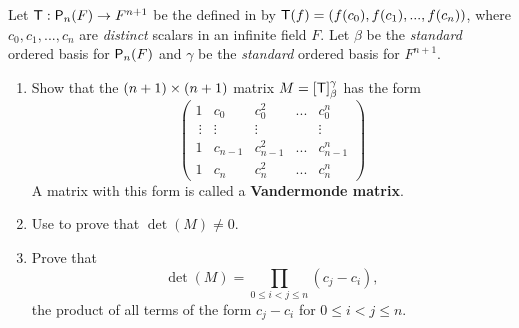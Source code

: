 \begin{exercise} \label{exercise 4.3.22}
Let \(\textsf{T} : \textsf{P}_n(F) \to F^{n + 1}\) be the \LTRAN{} defined in  by \(\textsf{T}(f) = (f(c_0), f(c_1), ..., f(c_n))\), where \(c_0, c_1, ..., c_n\) are \emph{distinct} scalars in an infinite field \(F\).
Let \(\beta\) be the \emph{standard} ordered basis for \(\textsf{P}_n(F)\) and \(\gamma\) be the \emph{standard} ordered basis for \(F^{n + 1}\).
\begin{enumerate}
\item Show that the \((n + 1) \times (n + 1)\) matrix \(M = [\textsf{T}]_{\beta}^{\gamma}\) has the form
\[
    \begin{pmatrix}
        1 & c_0 & c_0^2 & ... & c_0^n \\\
        \vdots & \vdots & \vdots & & \vdots \\
        1 & c_{n-1} & c_{n-1}^2 & ... & c_{n-1}^n \\
        1 & c_n & c_n^2 & ... & c_n^n
    \end{pmatrix}
\]
A matrix with this form is called a \textbf{Vandermonde matrix}.
\item Use \EXEC{2.4.22} to prove that \(\det(M) \ne 0\).
\item Prove that
\[
    \det(M) = \prod_{0 \le i < j \le n} (c_j - c_i),
\]
the product of all terms of the form \(c_j - c_i\) for \(0 \le i < j \le n\).
\end{enumerate}
\end{exercise}

